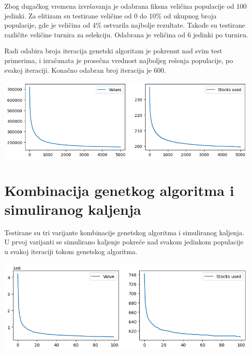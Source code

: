 \documentclass[12pt, a4paper]{article}
\begin{document}
Zbog dugačkog vremena izvršavanja je odabrana fiksna veličina populacije od 100 jedinki. Za elitizam su testirane veličine od 0 do 10\% od ukupnog broja populacije, gde je veličina od 4\% ostvarila najbolje rezultate. Takođe su testirane različite veličine turnira za selekciju. Odabrana je veličina od 6 jedinki po turniru.

Radi odabira broja iteracija genetski algoritam je pokrenut nad svim test primerima, i izračunata je prosečna vrednost najboljeg rešenja populacije, po svakoj iteraciji. Konačno odabran broj iteracija je 600.

\vspace{0.5cm}
\begin{center}
  \hspace{1cm}
  \includegraphics[width=\linewidth]{img/ga_iters.png}
  \hspace{1cm} 
\end{center}
\vspace{0.5cm}

\section{Kombinacija genetkog algoritma i simuliranog kaljenja}

Testirane su tri varijante kombinacije genetskog algoritma i simuliranog kaljenja. U prvoj varijanti se simulirano kaljenje pokreće nad svakom jedinkom populacije u svakoj iteraciji tokom genetskog algoritma. 

\vspace{0.5cm}
\begin{center}
  \hspace{1cm}
  \includegraphics[width=\linewidth]{img/ga_sa_1.png}
  \hspace{1cm} 
\end{center}
\vspace{0.5cm}
\end{document}
